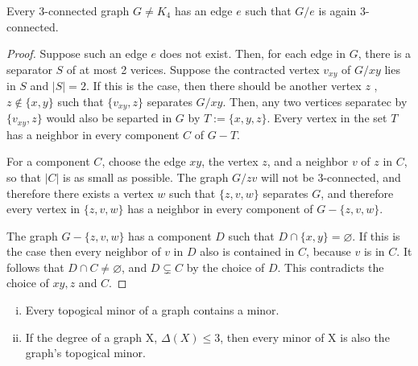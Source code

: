 \begin{lemma}\label{lemma3.2.4}
Every 3-connected graph $G\neq K_4$ has an edge $e$ such that $G/e$ is again 3-connected.
\end{lemma}
\begin{proof}
Suppose such an edge $e$ does not exist. Then, for each edge in $G$, there is a separator $S$ of at most 2 verices. Suppose the contracted vertex $v_{xy}$ of $G/xy$ lies in $S$ and $|S| = 2$. If this is the case, then there should be another vertex $z$ , $z \notin \{x,y\}$ such that $\{v_{xy},z\}$ separates $G/xy$. Then, any two vertices separatec by $\{v_{xy},z\}$ would also be separted in $G$ by $T:=\{x,y,z\}$. Every vertex in the set $T$ has a neighbor in every component $C$ of $G - T$. 

For a component $C$, choose the edge $xy$, the vertex $z$, and a neighbor $v$ of $z$ in $C$, so that $|C|$ is as small as possible. The graph $G/zv$ will not be 3-connected, and therefore there exists a vertex $w$ such that $\{z,v,w\}$ separates $G$, and therefore every vertex in $\{z,v,w\}$ has a neighbor in every component of $G - \{z,v,w\}$. 

The graph $G - \{z,v,w\}$ has a component $D$ such that $D \cap \{x,y\} = \varnothing$. If this is the case then every neighbor of $v$ in $D$ also is contained in $C$, because $v$ is in $C$. It follows that $D \cap C \neq \varnothing$, and $D \subsetneq C$ by the choice of $D$. This contradicts the choice of $xy, z$ and $C$.
\end{proof}

\begin{proposition}\label{prop1.7.4}
\begin{enumerate}[(i)]
\item{Every topogical minor of a graph contains a minor.}
\item{If the degree of a graph X, $\Delta(X) \leq 3$, then every minor of X is also the graph's topogical minor.}
\end{enumerate}
\end{proposition}

